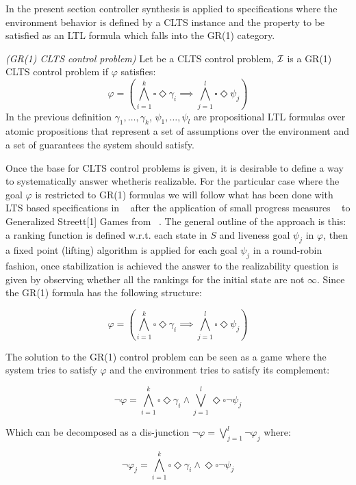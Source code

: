In the present section controller synthesis is applied to specifications where the environment behavior is defined by a CLTS instance and the property to be satisfied as an LTL formula which falls into the GR(1) category.


\begin{definition}\label{def:gr1_clts_control_problem} \emph{(GR(1) CLTS control problem)} 
	Let \controlProblemDef be a CLTS control problem, $\mathcal{I}$ is a GR(1) CLTS control problem if $\varphi$ satisfies: 
	\[\varphi = (\bigwedge_{i=1}^k\square \Diamond \gamma_i \implies \bigwedge_{j=1}^l\square \Diamond \psi_j)\]
	In the previous definition $\gamma_1, \ldots , \gamma_k$, $\psi_1, \ldots , \psi_l$ are propositional LTL formulas over atomic propositions that represent a set of assumptions over the environment and a set of guarantees the system should satisfy.
\end{definition}

Once the base for CLTS control problems is given, it is desirable to define a way to systematically answer whether\controlProblem is realizable.  
For the particular case where the goal $\varphi$ is restricted to GR(1) formulas we will follow what has been done with LTS based specifications in ~\cite{DBLP:phd/ethos/DIppolito13} after the application of small progress measures ~\cite{jurdzinski2000small} to Generalized Streett[1] Games from ~\cite{juvekar2006minimizing}. The general outline of the approach is this: a ranking function is defined w.r.t. each state in $S$ and liveness goal $\psi_j$ in $\varphi$, then a fixed point (lifting) algorithm is applied for each goal $\psi_j$ in a round-robin fashion, once stabilization is achieved the answer to the realizability question is given by observing whether all the rankings for the initial state are not $\infty$.
Since the GR(1) formula has the following structure:

\[\varphi = (\bigwedge_{i=1}^k\square \Diamond \gamma_i \implies \bigwedge_{j=1}^l\square \Diamond \psi_j)\]

The solution to the GR(1) control problem can be seen as a game where the system tries to satisfy $\varphi$ and the environment tries to satisfy its complement:

\[\neg\varphi = \bigwedge_{i=1}^k\square \Diamond \gamma_i \wedge \bigvee_{j=1}^l\Diamond \square \neg\psi_j\]

Which can be decomposed as a dis-junction $\neg\varphi = \bigvee_{j=1}^l \neg\varphi_j$ where:

\[\neg\varphi_j = \bigwedge_{i=1}^k\square \Diamond \gamma_i \wedge \Diamond \square \neg\psi_j\]

